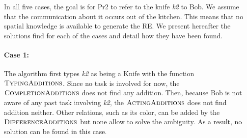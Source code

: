 In all five cases, the goal is for Pr2 to refer to the knife \textit{k2} to Bob. We assume that the communication about it occurs out of the kitchen. This means that no spatial knowledge is available to generate the RE. We present hereafter the solutions find for each of the cases and detail how they have been found.

\paragraph{Case 1:} The algorithm first types \textit{k2} as being a Knife with the function $\textsc{TypingAdditions}$.
Since no task is involved for now, the $\textsc{CompletionAdditions}$ does not find any addition. Then, because Bob is not aware of any past task involving \textit{k2}, the $\textsc{ActingAdditions}$ does not find addition neither. Other relations, such as its color, can be added by the $\textsc{DifferenceAdditions}$ but none allow to solve the ambiguity. As a result, no solution can be found in this case.

 

